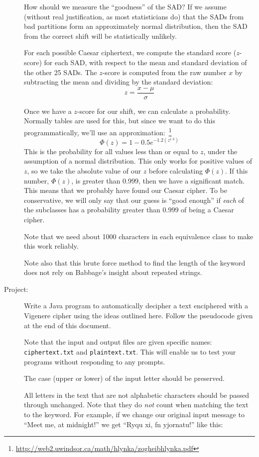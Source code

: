 \documentclass{article}
\begin{document}
\begin{description}
How should we measure the ``goodness'' of the SAD?  If we assume
(without real justification, as most statisticians do) that the SADs
from bad partitions form an approximately normal distribution, then the
SAD from the correct shift will be statistically unlikely.

For each possible Caesar ciphertext, we
compute the standard score ($z$-score) for each SAD, with respect to
the mean and standard deviation of the other 25 SADs.  The $z$-score
is computed from the raw number $x$ by subtracting the mean and
dividing by the standard deviation:
\[
z = \frac{x - \mu}{\sigma}
\]


Once we have a $z$-score for our shift, we can calculate a
probability.  Normally tables are used for this, but since we want to
do this programmatically, we'll use an
approximation:\
\footnote{\url{http://web2.uwindsor.ca/math/hlynka/zogheibhlynka.pdf}}
  \[ \Phi(z) = 1 - 0.5 e^{-1.2(z^{1.3})} \]
This is the probability for all values less than or equal to $z$,
under the assumption of a normal distribution.
This only works for positive values of $z$, so we take the absolute
value of our $z$ before calculating $\Phi(z)$.
If this number, $\Phi(z)$, is greater than 0.999, then we have a
significant match.  This means that we probably have found our
Caesar cipher.  To be conservative, we will only say that our guess is
``good enough'' if {\em each} of the subclasses has a probability
greater than 0.999 of being a Caesar cipher.

Note that we need about 1000 characters in each equivalence class
to make this work reliably.

Note also that this brute force method to find the length of the keyword
does not rely on Babbage's insight about repeated strings.  
  

\item[Project:]  Write a Java program to automatically decipher a text
  enciphered with a Vigenere cipher using the ideas outlined here.
  Follow the pseudocode given at the end of this document.

  Note that
  the input and output files are given specific names: {\tt
    ciphertext.txt} and {\tt plaintext.txt}.  This will
  enable us to test your programs without responding to any prompts.

  The case (upper or lower) of the input letter should be preserved.
  
  All letters in the text that are not alphabetic characters should
  be passed through unchanged.  Note that they do {\em not} count when
  matching the text to the keyword.  For example, if we change our
  original input message to ``Meet me, at midnight!'' we get ``Ryqu
  xi, fn yjornatu!'' like this:



\end{description}
\end{document}

